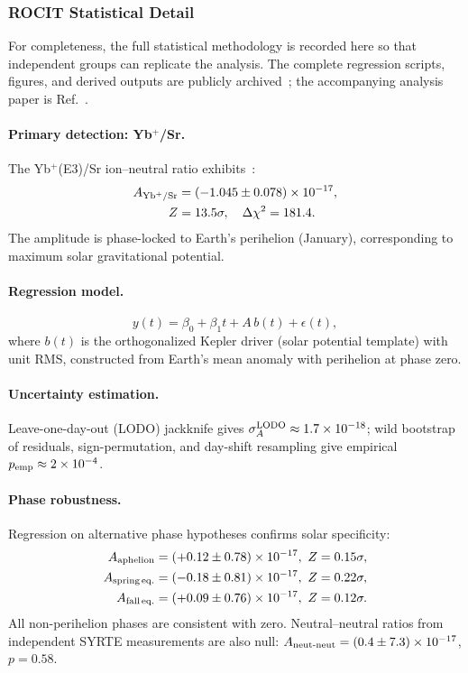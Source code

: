 \subsubsection{ROCIT Statistical Detail}\label{sec:clocks-rocit-detail}

For completeness, the full statistical methodology is recorded here so that independent groups can replicate the analysis.  The complete regression scripts, figures, and derived outputs are publicly archived~\cite{Alcock2025_ROCIT_data}; the accompanying analysis paper is Ref.~\cite{Alcock2025_ROCIT}.

\paragraph{Primary detection: Yb$^+$/Sr.}
The Yb$^+$(E3)/Sr ion--neutral ratio exhibits~\cite{ROCIT2024,Alcock2025_ROCIT}:
\begin{align}\label{eq:rocit-amplitude}
A_{\rm Yb^+/Sr} &= (-1.045 \pm 0.078) \times 10^{-17}, \nonumber\\
Z &= 13.5\sigma, \quad \Delta\chi^2 = 181.4.
\end{align}
The amplitude is phase-locked to Earth's perihelion (January), corresponding to maximum solar gravitational potential.

\paragraph{Regression model.}
\begin{equation}
y(t) = \beta_0 + \beta_1 t + A\,b(t) + \epsilon(t),
\end{equation}
where $b(t)$ is the orthogonalized Kepler driver (solar potential template)
with unit RMS, constructed from Earth's mean anomaly with perihelion
at phase zero.

\paragraph{Uncertainty estimation.}
Leave-one-day-out (LODO) jackknife gives $\sigma_A^{\rm LODO} \approx 1.7 \times 10^{-18}$; wild bootstrap of residuals, sign-permutation, and day-shift resampling give empirical $p_{\rm emp} \approx 2 \times 10^{-4}$.

\paragraph{Phase robustness.}
Regression on alternative phase hypotheses confirms solar specificity:
\begin{align}
A_{\rm aphelion} &= (+0.12 \pm 0.78) \times 10^{-17},\ Z = 0.15\sigma, \nonumber\\
A_{\rm spring\,eq.} &= (-0.18 \pm 0.81) \times 10^{-17},\ Z = 0.22\sigma, \nonumber\\
A_{\rm fall\,eq.} &= (+0.09 \pm 0.76) \times 10^{-17},\ Z = 0.12\sigma.
\end{align}
All non-perihelion phases are consistent with zero.  Neutral--neutral ratios from independent SYRTE measurements are also null: $A_{\rm neut\text{-}neut} = (0.4 \pm 7.3) \times 10^{-17}$, $p = 0.58$.

